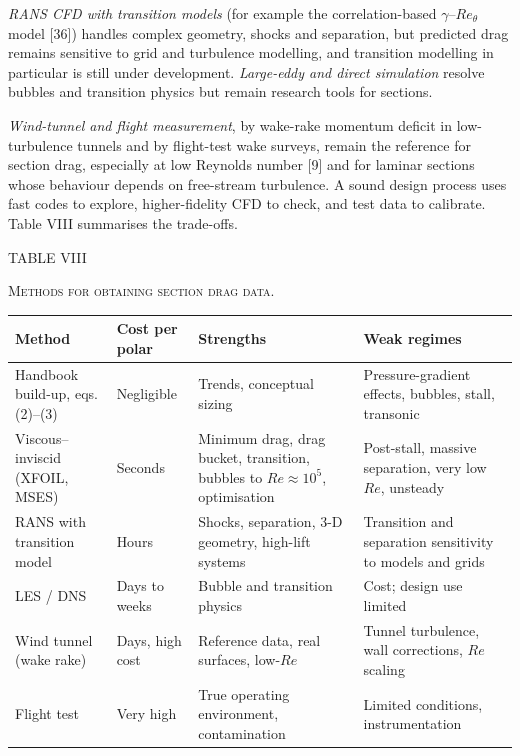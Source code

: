 \documentclass[10pt,a4paper,twocolumn]{article}
\begin{document}
\emph{RANS CFD with transition models} (for example the
correlation-based \(\gamma\)--\(Re_\theta\) model {[}36{]}) handles
complex geometry, shocks and separation, but predicted drag remains
sensitive to grid and turbulence modelling, and transition modelling in
particular is still under development. \emph{Large-eddy and direct
simulation} resolve bubbles and transition physics but remain research
tools for sections.

\emph{Wind-tunnel and flight measurement}, by wake-rake momentum deficit
in low-turbulence tunnels and by flight-test wake surveys, remain the
reference for section drag, especially at low Reynolds number {[}9{]}
and for laminar sections whose behaviour depends on free-stream
turbulence. A sound design process uses fast codes to explore,
higher-fidelity CFD to check, and test data to calibrate. Table VIII
summarises the trade-offs.

\begin{table}[!t]
\centering
{\footnotesize TABLE VIII\par\textsc{Methods for obtaining section drag data.}\par}\vspace{4pt}
{\footnotesize\setlength{\tabcolsep}{4pt}\renewcommand{\arraystretch}{1.12}
\begin{tabularx}{\textwidth}{>{\raggedright\arraybackslash}Xl>{\raggedright\arraybackslash}X>{\raggedright\arraybackslash}X}
\toprule
\textbf{Method} & \textbf{Cost per polar} & \textbf{Strengths} & \textbf{Weak regimes} \\
\midrule
Handbook build-up, eqs. (2)--(3) & Negligible & Trends, conceptual sizing & Pressure-gradient effects, bubbles, stall, transonic \\
Viscous--inviscid (XFOIL, MSES) & Seconds & Minimum drag, drag bucket, transition, bubbles to \(Re\approx10^5\),
optimisation & Post-stall, massive separation, very low \(Re\), unsteady \\
RANS with transition model & Hours & Shocks, separation, 3-D geometry, high-lift systems & Transition and separation sensitivity to models and grids \\
LES / DNS & Days to weeks & Bubble and transition physics & Cost; design use limited \\
Wind tunnel (wake rake) & Days, high cost & Reference data, real surfaces, low-\(Re\) & Tunnel turbulence, wall corrections, \(Re\) scaling \\
Flight test & Very high & True operating environment, contamination & Limited conditions, instrumentation \\
\bottomrule
\end{tabularx}
}
\end{table}
\end{document}
